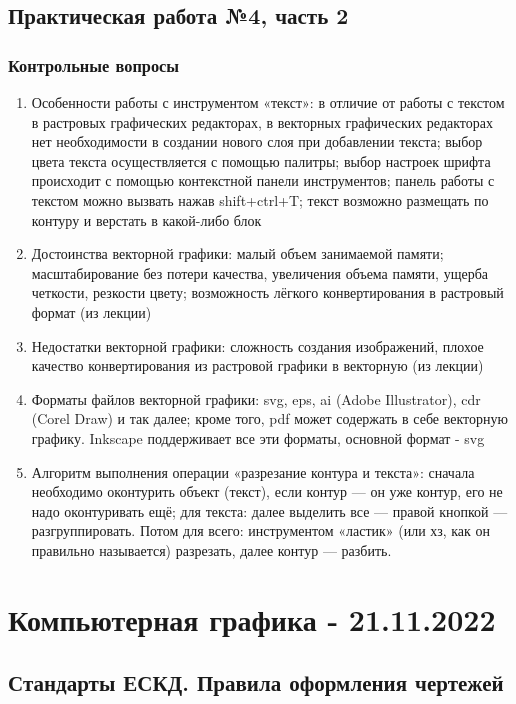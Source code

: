 \documentclass{article}
\begin{document}
\subsection{Практическая работа №4, часть 2}

\subsubsection{Контрольные вопросы}

\begin{enumerate}
    \item Особенности работы с инструментом «текст»: в отличие от работы с текстом в растровых графических редакторах, в векторных графических редакторах нет необходимости в создании нового слоя при добавлении текста; выбор цвета текста осуществляется с помощью палитры; выбор настроек шрифта происходит с помощью контекстной панели инструментов; панель работы с текстом можно вызвать нажав shift+ctrl+T; текст возможно размещать по контуру и верстать в какой-либо блок
    \item Достоинства векторной графики: малый объем занимаемой памяти; масштабирование без потери качества, увеличения объема памяти, ущерба четкости, резкости цвету; возможность лёгкого конвертирования в растровый формат (из лекции)
    \item Недостатки векторной графики: сложность создания изображений, плохое качество конвертирования из растровой графики в векторную (из лекции)
    \item Форматы файлов векторной графики: svg, eps, ai (Adobe Illustrator), cdr (Corel Draw) и так далее; кроме того, pdf может содержать в себе векторную графику. Inkscape поддерживает все эти форматы, основной формат - svg
    \item Алгоритм выполнения операции «разрезание контура и текста»: сначала необходимо оконтурить объект (текст), если контур — он уже контур, его не надо оконтуривать ещё; для текста: далее выделить все — правой кнопкой — разгруппировать. Потом для всего: инструментом «ластик» (или хз, как он правильно называется) разрезать, далее контур — разбить.
\end{enumerate}

\pagebreak
\section{Компьютерная графика - 21.11.2022}

\subsection{Стандарты ЕСКД. Правила оформления чертежей}
\end{document}
